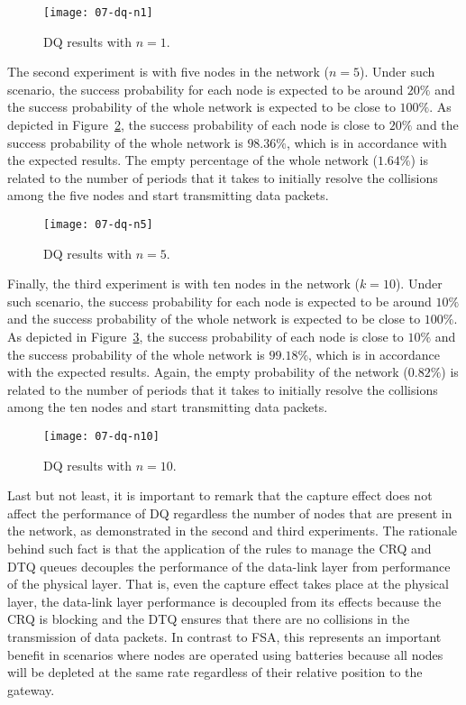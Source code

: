 \begin{figure}[!ht]
    \centering
	\texttt{[image: 07-dq-n1]}
    \caption{DQ results with $n=1$.}
    \label{fig:07-dq-n1}
\end{figure}

The second experiment is with five nodes in the network ($n=5$). Under such scenario, the success probability for each node is expected to be around $20\%$ and the success probability of the whole network is expected to be close to $100\%$. As depicted in Figure~\ref{fig:07-dq-n5}, the success probability of each node is close to $20\%$ and the success probability of the whole network is $98.36\%$, which is in accordance with the expected results. The empty percentage of the whole network ($1.64\%$) is related to the number of periods that it takes to initially resolve the collisions among the five nodes and start transmitting data packets.

\begin{figure}[!ht]
    \centering
	\texttt{[image: 07-dq-n5]}
    \caption{DQ results with $n=5$.}
    \label{fig:07-dq-n5}
\end{figure}

Finally, the third experiment is with ten nodes in the network ($k=10$). Under such scenario, the success probability for each node is expected to be around $10\%$ and the success probability of the whole network is expected to be close to $100\%$. As depicted in Figure~\ref{fig:07-dq-n10}, the success probability of each node is close to $10\%$ and the success probability of the whole network is $99.18\%$, which is in accordance with the expected results. Again, the empty probability of the network ($0.82\%$) is related to the number of periods that it takes to initially resolve the collisions among the ten nodes and start transmitting data packets.

\begin{figure}[!ht]
    \centering
	\texttt{[image: 07-dq-n10]}
    \caption{DQ results with $n=10$.}
    \label{fig:07-dq-n10}
\end{figure}

Last but not least, it is important to remark that the capture effect does not affect the performance of DQ regardless the number of nodes that are present in the network, as demonstrated in the second and third experiments. The rationale behind such fact is that the application of the rules to manage the CRQ and DTQ queues decouples the performance of the data-link layer from performance of the physical layer. That is, even the capture effect takes place at the physical layer, the data-link layer performance is decoupled from its effects because the CRQ is blocking and the DTQ ensures that there are no collisions in the transmission of data packets. In contrast to FSA, this represents an important benefit in scenarios where nodes are operated using batteries because all nodes will be depleted at the same rate regardless of their relative position to the gateway.